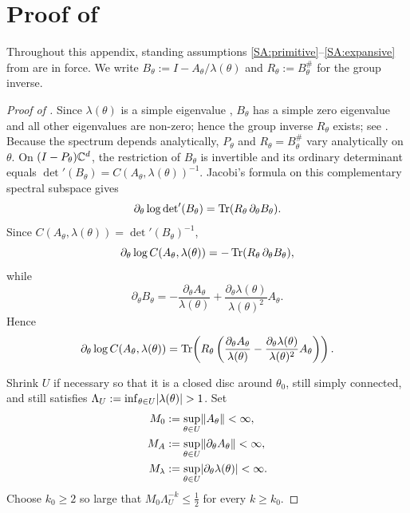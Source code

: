 \section{Proof of \texorpdfstring{}{the appendix proposition}}
\label{sec:appendix-proofs}

Throughout this appendix, standing assumptions
\ref{SA:primitive}--\ref{SA:expansive} from  are
in force. We write \(B_\theta:=I-A_\theta/\lambda(\theta)\) and
\(R_\theta:=B_\theta^{\#}\) for the group inverse.

\begin{proof}[Proof of ]
  Since \(\lambda(\theta)\) is a simple eigenvalue
  \cite[Chapter~II, \S1]{Kato1995Perturbation}, \(B_\theta\) has a
  simple zero eigenvalue and all other eigenvalues are non-zero; hence
  the group inverse \(R_\theta\) exists; see
  \cite[Chapter~4]{CampbellMeyer1979}. Because the spectrum depends
  analytically, \(P_\theta\) and \(R_\theta=B_\theta^{\#}\) vary
  analytically on \(\theta\). On \((I-P_\theta)\mathbb{C}^d\), the restriction
  of \(B_\theta\) is invertible and its ordinary determinant equals
  \(\det\nolimits'(B_\theta)=C(A_\theta,\lambda(\theta))^{-1}\).
  Jacobi's formula on this complementary spectral subspace gives
  \[
    \partial_\theta\log\det\nolimits'(B_\theta)
    =\operatorname{Tr}(R_\theta\,\partial_\theta B_\theta).
  \]
  Since \(C(A_\theta,\lambda(\theta))=\det\nolimits'(B_\theta)^{-1}\),
  \[
    \partial_\theta\log C(A_\theta,\lambda(\theta))
    =-\operatorname{Tr}(R_\theta\,\partial_\theta B_\theta),
  \]
  while
  \[
    \partial_\theta B_\theta
    =-\frac{\partial_\theta A_\theta}{\lambda(\theta)}
      +\frac{\partial_\theta\lambda(\theta)}{\lambda(\theta)^2}
       A_\theta.
  \]
  Hence
  \[
    \partial_\theta\log C(A_\theta,\lambda(\theta))
    =\operatorname{Tr}\!\left(
      R_\theta\left(
        \frac{\partial_\theta A_\theta}{\lambda(\theta)}
        -\frac{\partial_\theta\lambda(\theta)}{\lambda(\theta)^2}
         A_\theta\right)\right).
  \]

  Shrink \(U\) if necessary so that it is a closed disc around
  \(\theta_0\), still simply connected, and still satisfies
  \(\Lambda_U:=\inf_{\theta\in U}\lvert \lambda(\theta) \rvert>1\). Set
  \begin{align*}
    M_0&:=\sup_{\theta\in U}\lVert A_\theta \rVert<\infty,\\
    M_A&:=\sup_{\theta\in U}\lVert \partial_\theta A_\theta \rVert<\infty,\\
    M_\lambda&:=\sup_{\theta\in U}\lvert \partial_\theta\lambda(\theta) \rvert
    <\infty.
  \end{align*}
  Choose \(k_0\ge 2\) so large that
  \(M_0\Lambda_U^{-k}\le \tfrac12\) for every \(k\ge k_0\).


\end{proof}

